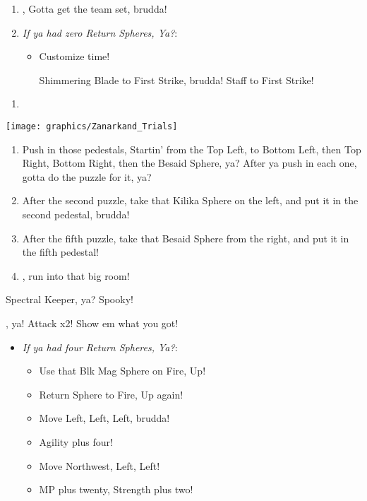 \begin{enumerate}[resume]
\item \formation{\tidus}{\auron}{\yuna}, Gotta get the team set, brudda!
\bothcb
\item \textit{If ya had zero Return Spheres, Ya?}:
\begin{itemize}
\item Customize time!
\begin{itemize}
\auronf Shimmering Blade to First Strike, brudda!
\yunaf Staff to First Strike!
\end{itemize}
\end{itemize}
\end{enumerate}
\begin{enumerate}[resume]
\item {\large \save}
\end{enumerate}
\texttt{[image: graphics/Zanarkand\_Trials]}
\begin{enumerate}[resume]
\item Push in those pedestals, Startin' from the Top Left, to Bottom Left, then Top Right, Bottom Right, then the Besaid Sphere, ya? After ya push in each one, gotta do the puzzle for it, ya?
\item After the second puzzle, take that Kilika Sphere on the left, and put it in the second pedestal, brudda!
\item After the fifth puzzle, take that Besaid Sphere from the right, and put it in the fifth pedestal!
\item \cs, run into that big room!
\end{enumerate}
\begin{battle}[52000]{Spectral Keeper, ya? Spooky!}
\begin{itemize}
\summon{\bahamut}, ya!
\bahamutf Attack x2! Show em what you got!
\end{itemize}
\end{battle}
\begin{spheregrid}
\begin{itemize}
\yunaf
\begin{itemize}
\item \textit{If ya had four Return Spheres, Ya?}:
\begin{itemize}
\item Use that Blk Mag Sphere on Fire, Up!
\item Return Sphere to Fire, Up again!
\item Move Left, Left, Left, brudda!
\item Agility plus four!
\item Move Northwest, Left, Left!
\item MP plus twenty, Strength plus two!
\end{itemize}
\end{itemize}
\end{itemize}
\end{spheregrid}
